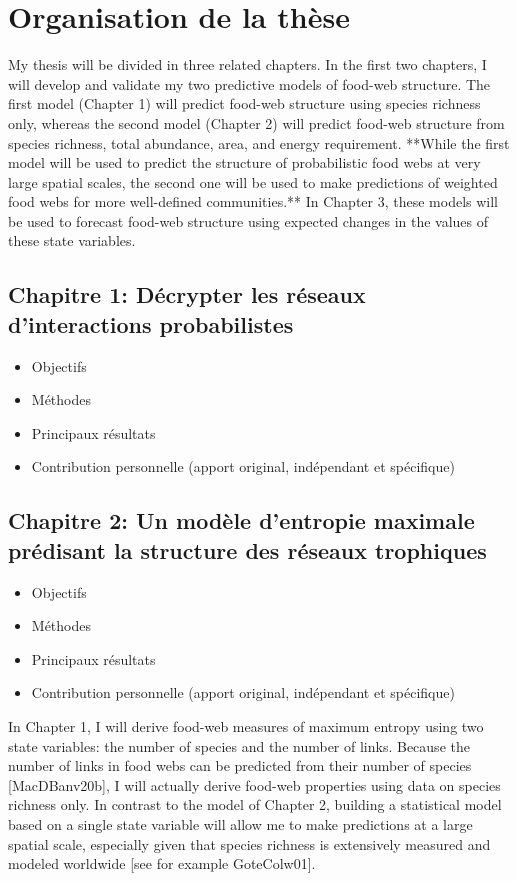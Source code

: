 
\section{Organisation de la thèse}

My thesis will be divided in three related chapters. In the first two chapters,
I will develop and validate my two predictive models of food-web structure. The
first model (Chapter 1) will predict food-web structure using species richness
only, whereas the second model (Chapter 2) will predict food-web structure from
species richness, total abundance, area, and energy requirement. **While the
first model will be used to predict the structure of probabilistic food webs at
very large spatial scales, the second one will be used to make predictions of
weighted food webs for more well-defined communities.** In Chapter 3, these
models will be used to forecast food-web structure using expected changes in the
values of these state variables.

\subsection{Chapitre 1: Décrypter les réseaux d'interactions probabilistes} 

\begin{itemize}
    \item Objectifs
    \item Méthodes 
    \item Principaux résultats
    \item Contribution personnelle (apport original, indépendant et spécifique)
\end{itemize}

\subsection{Chapitre 2: Un modèle d'entropie maximale prédisant la structure des réseaux trophiques} 

\begin{itemize}
    \item Objectifs
    \item Méthodes 
    \item Principaux résultats
    \item Contribution personnelle (apport original, indépendant et spécifique)
\end{itemize}

In Chapter 1, I will derive food-web measures of maximum entropy using two state
variables: the number of species and the number of links. Because the number of
links in food webs can be predicted from their number of species [MacDBanv20b],
I will actually derive food-web properties using data on species richness only.
In contrast to the model of Chapter 2, building a statistical model based on a
single state variable will allow me to make predictions at a large spatial
scale, especially given that species richness is extensively measured and
modeled worldwide [see for example GoteColw01].

